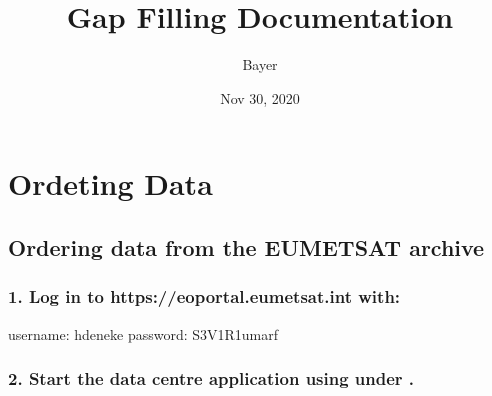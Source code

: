 \documentclass[letterpaper,10pt,english]{sphinxmanual}
\title{Gap Filling Documentation}
\date{Nov 30, 2020}
\author{Bayer}
\begin{document}
\pagestyle{empty}
\sphinxmaketitle
\pagestyle{plain}
\sphinxtableofcontents
\pagestyle{normal}
\label{\detokenize{index::doc}}



\chapter{Ordeting Data}
\label{\detokenize{ordering_data:ordeting-data}}\label{\detokenize{ordering_data::doc}}

\section{Ordering data from the EUMETSAT archive}
\label{\detokenize{ordering_data:ordering-data-from-the-eumetsat-archive}}

\subsection{1. Log in to https://eoportal.eumetsat.int with:}
\label{\detokenize{ordering_data:log-in-to-https-eoportal-eumetsat-int-with}}

\begin{sphinxVerbatim}[commandchars=\\\{\}]
username: hdeneke
password: S3V1R1umarf
\end{sphinxVerbatim}


\subsection{2. Start the data centre application using  under .}
\label{\detokenize{ordering_data:start-the-data-centre-application-using-access-under-data-centre}}
\end{document}

